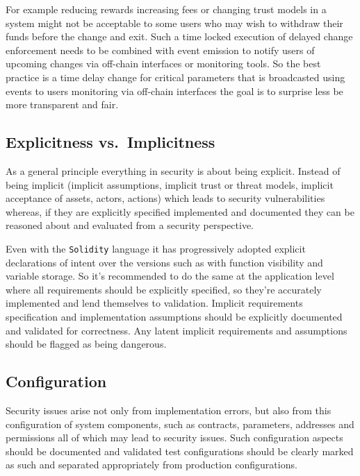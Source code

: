 For example reducing rewards increasing fees or changing trust models in
a system might not be acceptable to some users who may wish to withdraw
their funds before the change and exit. Such a time locked execution of
delayed change enforcement needs to be combined with event emission to
notify users of upcoming changes via off-chain interfaces or monitoring
tools. So the best practice is a time delay change for critical
parameters that is broadcasted using events to users monitoring via
off-chain interfaces the goal is to surprise less be more transparent
and fair.

\subsection{Explicitness
vs.~Implicitness}\label{explicitness-vs.-implicitness}

As a general principle everything in security is about being explicit.
Instead of being implicit (implicit assumptions, implicit trust or
threat models, implicit acceptance of assets, actors, actions) which
leads to security vulnerabilities whereas, if they are explicitly
specified implemented and documented they can be reasoned about and
evaluated from a security perspective.

Even with the \texttt{Solidity} language it has progressively adopted
explicit declarations of intent over the versions such as with function
visibility and variable storage. So it's recommended to do the same at
the application level where all requirements should be explicitly
specified, so they're accurately implemented and lend themselves to
validation. Implicit requirements specification and implementation
assumptions should be explicitly documented and validated for
correctness. Any latent implicit requirements and assumptions should be
flagged as being dangerous.

\subsection{Configuration}\label{configuration}

Security issues arise not only from implementation errors, but also from
this configuration of system components, such as contracts, parameters,
addresses and permissions all of which may lead to security issues. Such
configuration aspects should be documented and validated test
configurations should be clearly marked as such and separated
appropriately from production configurations.

